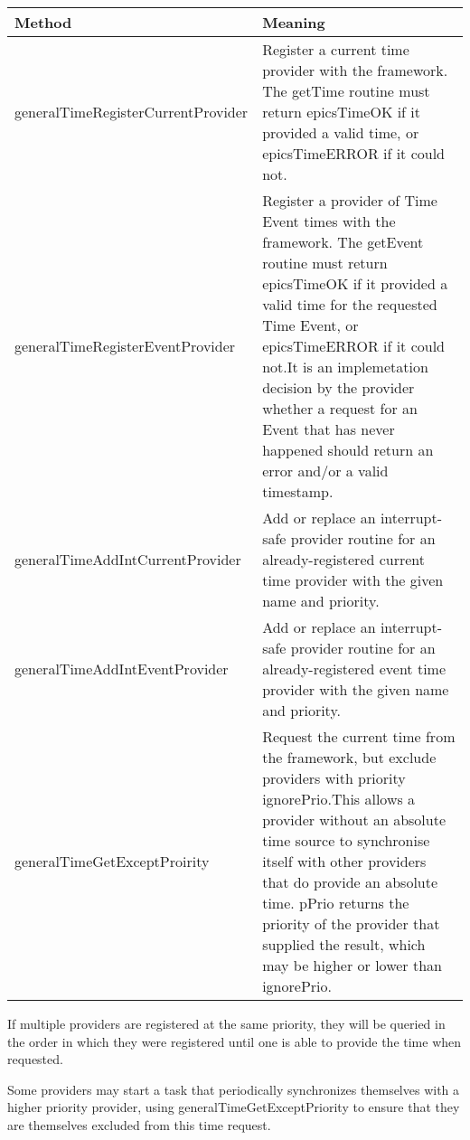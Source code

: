 \begin{center}
\begin{longtable}{p{2.125in}p{4.625in}}
\textbf{Method} & \textbf{Meaning}\\
\hline
generalTimeRegisterCurrentProvider & Register a current time provider with the framework. The getTime routine must return epicsTimeOK if it provided a valid time, or epicsTimeERROR if it could not.\\
generalTimeRegisterEventProvider & Register a provider of Time Event times with the framework. The getEvent routine must return epicsTimeOK if it provided a valid time for the requested Time Event, or epicsTimeERROR if it could not.It is an implemetation decision by the provider whether a request for an Event that has never happened should return an error and/or a valid timestamp.\\
generalTimeAddIntCurrentProvider & Add or replace an interrupt-safe provider routine for an already-registered current time provider with the given name and priority.\\
generalTimeAddIntEventProvider & Add or replace an interrupt-safe provider routine for an already-registered event time provider with the given name and priority.\\
generalTimeGetExceptProirity & Request the current time from the framework, but exclude providers with priority ignorePrio.This allows a provider without an absolute time source to synchronise itself with other providers that do provide an absolute time.  pPrio returns the priority of the provider that supplied the result, which may be higher or lower than ignorePrio.
\end{longtable}

\end{center}


If multiple providers are registered at the same priority, they will be queried in the order in which they were registered 
until one is able to provide the time when requested.

Some providers may start a task that periodically synchronizes themselves with a higher priority provider, using 
generalTimeGetExceptPriority to ensure that they are themselves excluded from this time request.

